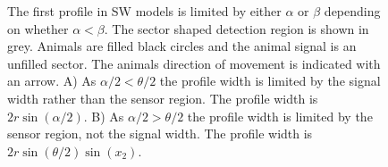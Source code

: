 \begin{figure}[t]
  \centering
{
}
\caption[The first profile in SW models]{
The first profile in SW models is limited by either $\alpha$ or $\beta$ depending on whether $\alpha < \beta$.
The sector shaped detection region is shown in grey.
Animals are filled black circles and the animal signal is an unfilled sector.
The animals direction of movement is indicated with an arrow.
A) As $\alpha/2 < \theta/2$ the profile width is limited by the signal width rather than the sensor region.
The profile width is $2r\sin\left(\alpha/2\right)$. 
B) As $\alpha/2 > \theta/2$ the profile width is limited by the sensor region, not the signal width.
The profile width is $2r\sin\left(\theta/2\right)\sin(x_2)$.
}
\label{fig:forward}
\end{figure}


